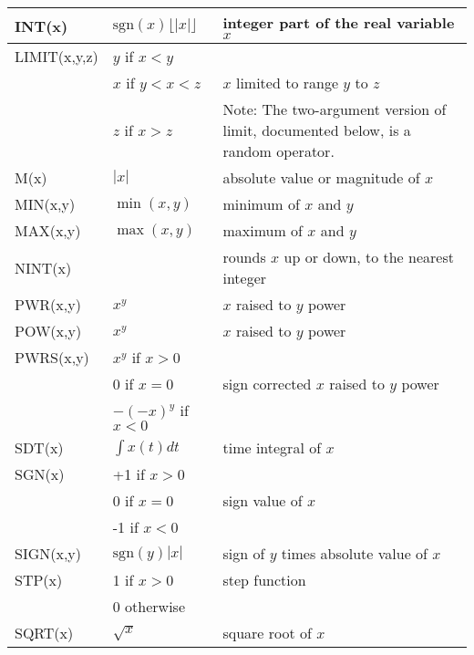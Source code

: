 {\begin{longtable}{>{\raggedright\small}m{1in}>{\raggedright\small}m{2in}>{\raggedright\let\\\tabularnewline\small}m{2in}}
    INT(x) & $\mathrm{sgn}(x)\lfloor |x|\rfloor$ & integer part of the real 
    variable $x$  \\ \hline

    LIMIT(x,y,z)
    & $y$ if $x < y$ & \\
    & $x$ if $y < x < z$  & $x$ limited to range $y$ to $z$ \\
    & $z$ if $x > z$ & Note: The two-argument version of limit, documented below, is a random operator. \\ \hline
    
    M(x) & $|x|$ & absolute value or magnitude of $x$ \\ \hline

    MIN(x,y) & $\min(x,y)$ & minimum of $x$ and $y$  \\ \hline

    MAX(x,y) & $\max(x,y)$ & maximum of $x$ and $y$  \\ \hline

    NINT(x) &            & rounds $x$ up or down, to the nearest integer  \\ \hline

    PWR(x,y) & $x^{y}$ & $x$ raised to $y$ power  \\ \hline
    POW(x,y) & $x^{y}$ & $x$ raised to $y$ power  \\ \hline
    PWRS(x,y)
    & $x^{y}$ if $x > 0$ & \\
    & 0 if $x = 0$ & sign corrected $x$ raised to $y$ power  \\
    & $-(-x)^{y}$ if $x < 0$ & \\ \hline

    SDT(x)
    & $\int x(t)  dt$ & time integral of $x$ \\ \hline
    
    SGN(x)
    & +1 if $x > 0$ & \\
    & 0 if $x = 0$  & sign value of $x$\\
    & -1 if $x < 0$ & \\ \hline

    SIGN(x,y) & $\mathrm{sgn}(y)|x|$ & sign of $y$ times absolute value of $x$
    \\ \hline

    STP(x)
    & 1 if $x > 0$ & step function \\
    & 0 otherwise &                                      \\ \hline

    SQRT(x) & $\sqrt{x}$ & square root of $x$ \\ \hline


\end{longtable}}
